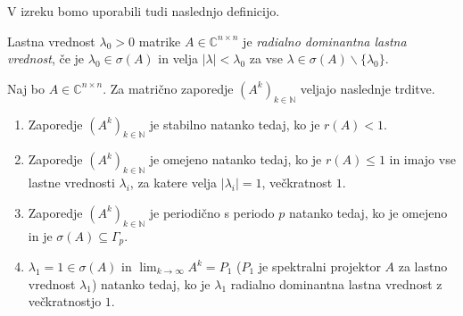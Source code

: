 \documentclass[mat1]{fmfdelo}
\newcommand{\N}{\mathbb N}
\newcommand{\C}{\mathbb C}
\begin{document}
V izreku bomo uporabili tudi naslednjo definicijo.
\begin{definicija}
    Lastna vrednost $\lambda_0 > 0$ matrike $A \in \C^{n \times n}$ je \emph{radialno dominantna lastna vrednost}, če je $\lambda_0 \in \sigma(A)$ in velja $|\lambda| < \lambda_0$ za vse $\lambda \in \sigma(A) \backslash \{\lambda_0\}$.
\end{definicija}
\begin{izrek}\label{izrekAsimptotika}
    Naj bo $A \in \C^{n \times n}$. Za matrično zaporedje $(A^k)_{k\in\N}$ veljajo naslednje trditve.
    \begin{enumerate}
        \item Zaporedje $(A^k)_{k\in\N}$ je stabilno natanko tedaj, ko je $r(A) < 1$.
        \item Zaporedje $(A^k)_{k\in\N}$ je omejeno natanko tedaj, ko je $r(A) \leq 1$ in imajo vse lastne vrednosti $\lambda_i$, za katere velja $|\lambda_i| = 1$, večkratnost $1$.
        \item Zaporedje $(A^k)_{k\in\N}$ je periodično s periodo $p$ natanko tedaj, ko je omejeno in je $\sigma(A) \subseteq \Gamma_p$.
        \item $\lambda_1 = 1 \in \sigma(A)$ in $\lim_{k\rightarrow\infty} A^k = P_1$ ($P_1$ je spektralni projektor $A$ za lastno vrednost $\lambda_1$) natanko tedaj, ko je $\lambda_1$ radialno dominantna lastna vrednost z večkratnostjo $1$.
    \end{enumerate}
\end{izrek}
\end{document}
